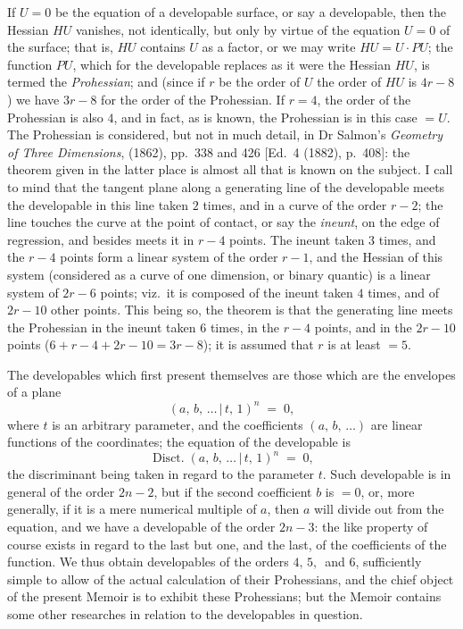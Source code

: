 \documentclass[11pt,a4paper]{article}
\providecommand{\mid}{\,|\,}
\providecommand{\Disct}{\operatorname{Disct.}}
\begin{document}
If $U = 0$ be the equation of a developable surface, or say a developable, then the Hessian $HU$ vanishes, not identically, but only by virtue of the equation $U = 0$ of the surface; that is, $HU$ contains $U$ as a factor, or we may write $HU = U\cdot PU$; the function $PU$, which for the developable replaces as it were the Hessian $HU$, is termed the \textit{Prohessian}; and (since if $r$ be the order of $U$ the order of $HU$ is $4r - 8$) we have $3r - 8$ for the order of the Prohessian. If $r = 4$, the order of the Prohessian is also $4$, and in fact, as is known, the Prohessian is in this case $= U$. The Prohessian is considered, but not in much detail, in Dr Salmon's \textit{Geometry of Three Dimensions}, (1862), pp.~338 and 426 [Ed.\ 4 (1882), p.~408]: the theorem given in the latter place is almost all that is known on the subject. I call to mind that the tangent plane along a generating line of the developable meets the developable in this line taken $2$ times, and in a curve of the order $r - 2$; the line touches the curve at the point of contact, or say the \textit{ineunt}, on the edge of regression, and besides meets it in $r - 4$ points. The ineunt taken $3$ times, and the $r - 4$ points form a linear system of the order $r - 1$, and the Hessian of this system (considered as a curve of one dimension, or binary quantic) is a linear system of $2r - 6$ points; viz.\ it is composed of the ineunt taken $4$ times, and of $2r - 10$ other points. This being so, the theorem is that the generating line meets the Prohessian in the ineunt taken $6$ times, in the $r - 4$ points, and in the $2r - 10$ points ($6 + r - 4 + 2r - 10 = 3r - 8$); it is assumed that $r$ is at least $= 5$.

\medskip

The developables which first present themselves are those which are the envelopes of a plane
\[
(a,\,b,\,\ldots\mid t,\,1)^n \;=\; 0,
\]
where $t$ is an arbitrary parameter, and the coefficients $(a,\,b,\,\ldots)$ are linear functions of the coordinates; the equation of the developable is
\[
\Disct(a,\,b,\,\ldots\mid t,\,1)^n \;=\; 0,
\]
the discriminant being taken in regard to the parameter $t$. Such developable is in general of the order $2n - 2$, but if the second coefficient $b$ is $= 0$, or, more generally, if it is a mere numerical multiple of $a$, then $a$ will divide out from the equation, and we have a developable of the order $2n - 3$: the like property of course exists in regard to the last but one, and the last, of the coefficients of the function. We thus obtain developables of the orders $4,\,5,\,$ and $6$, sufficiently simple to allow of the actual calculation of their Prohessians, and the chief object of the present Memoir is to exhibit these Prohessians; but the Memoir contains some other researches in relation to the developables in question.
\end{document}
